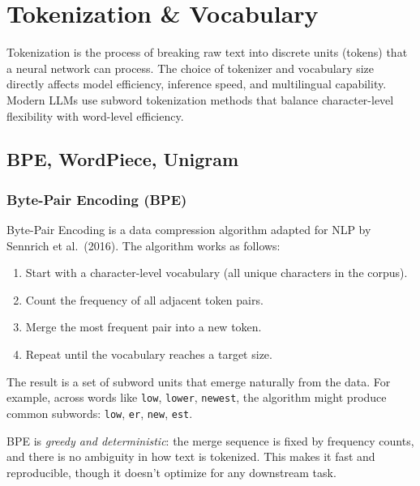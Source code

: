 
\section{Tokenization \& Vocabulary}

Tokenization is the process of breaking raw text into discrete units (tokens) that a neural network can process. The choice of tokenizer and vocabulary size directly affects model efficiency, inference speed, and multilingual capability. Modern LLMs use subword tokenization methods that balance character-level flexibility with word-level efficiency.

\subsection{BPE, WordPiece, Unigram}

\subsubsection*{Byte-Pair Encoding (BPE)}

Byte-Pair Encoding is a data compression algorithm adapted for NLP by Sennrich et al.\ (2016). The algorithm works as follows:

\begin{enumerate}
  \item Start with a character-level vocabulary (all unique characters in the corpus).
  \item Count the frequency of all adjacent token pairs.
  \item Merge the most frequent pair into a new token.
  \item Repeat until the vocabulary reaches a target size.
\end{enumerate}

The result is a set of subword units that emerge naturally from the data. For example, across words like \texttt{low}, \texttt{lower}, \texttt{newest}, the algorithm might produce common subwords: \texttt{low}, \texttt{er}, \texttt{new}, \texttt{est}.

\begin{intuitionbox}
BPE is \emph{greedy and deterministic}: the merge sequence is fixed by frequency counts, and there is no ambiguity in how text is tokenized. This makes it fast and reproducible, though it doesn't optimize for any downstream task.
\end{intuitionbox}

